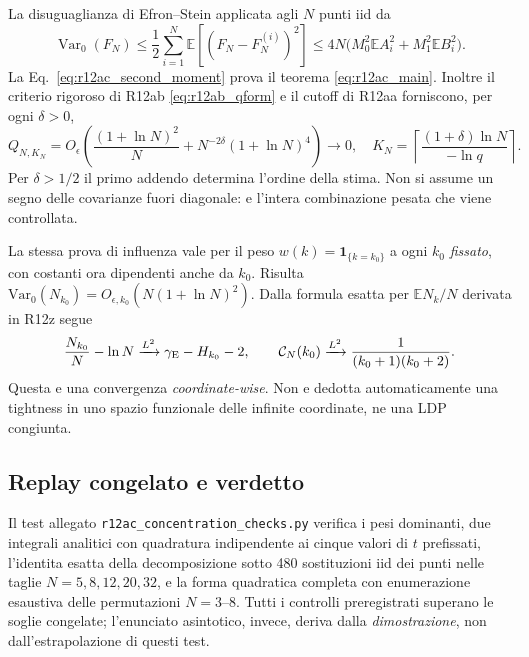 \documentclass[11pt,a4paper]{article}
\begin{document}
La disuguaglianza di Efron--Stein \cite{EfronStein1981} applicata agli $N$ punti iid da
\begin{equation}
 \operatorname{Var}_0(F_N)\le\frac12\sum_{i=1}^N
 \mathbb E[(F_N-F_N^{(i)})^2]
 \le 4N\bigl(M_0^2\mathbb EA_i^2+M_1^2\mathbb EB_i^2\bigr).
 \label{eq:r12ac_efron}
\end{equation}
La Eq.~\eqref{eq:r12ac_second_moment} prova il teorema \eqref{eq:r12ac_main}. Inoltre il criterio rigoroso di R12ab \eqref{eq:r12ab_qform} e il cutoff di R12aa forniscono, per ogni $\delta>0$,
\begin{equation}
 \boxed{Q_{N,K_N}=O_\epsilon\left(
 \frac{(1+\ln N)^2}{N}+N^{-2\delta}(1+\ln N)^4\right)\to0,\quad
 K_N=\left\lceil\frac{(1+\delta)\ln N}{-\ln q}\right\rceil.}
 \label{eq:r12ac_Q_rate}
\end{equation}
Per $\delta>1/2$ il primo addendo determina l'ordine della stima. Non si assume un segno delle covarianze fuori diagonale: e l'intera combinazione pesata che viene controllata.

La stessa prova di influenza vale per il peso $w(k)=\mathbf1_{\{k=k_0\}}$ a ogni $k_0$ \emph{fissato}, con costanti ora dipendenti anche da $k_0$. Risulta $\mathrm{Var}_0(N_{k_0})=O_{\epsilon,k_0}(N(1+\ln N)^2)$. Dalla formula esatta per $\mathbb EN_k/N$ derivata in R12z segue
\begin{equation}
 \frac{N_{k_0}}N-\ln N\xrightarrow{L^2}
 \gamma_{\rm E}-H_{k_0}-2,
 \qquad
 \mathcal C_N(k_0)\xrightarrow{L^2}
 \frac1{(k_0+1)(k_0+2)}.
 \label{eq:r12ac_fixed_coordinates}
\end{equation}
Questa e una convergenza \emph{coordinate-wise}. Non e dedotta automaticamente una tightness in uno spazio funzionale delle infinite coordinate, ne una LDP congiunta.

\subsection{Replay congelato e verdetto}

Il test allegato \texttt{r12ac\_concentration\_checks.py} verifica i pesi dominanti, due integrali analitici con quadratura indipendente ai cinque valori di $t$ prefissati, l'identita esatta della decomposizione sotto 480 sostituzioni iid dei punti nelle taglie $N=5,8,12,20,32$, e la forma quadratica completa con enumerazione esaustiva delle permutazioni $N=3$--$8$. Tutti i controlli preregistrati superano le soglie congelate; l'enunciato asintotico, invece, deriva dalla \emph{dimostrazione}, non dall'estrapolazione di questi test.
\end{document}
